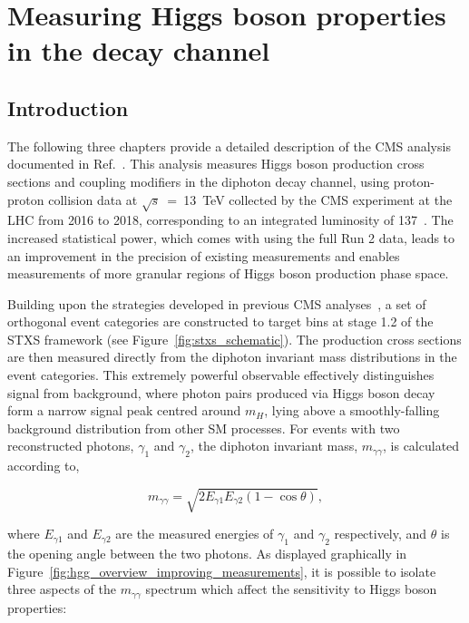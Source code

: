 \chapter{Measuring Higgs boson properties in the \Hgg decay channel}
\label{chap:hgg_overview}

\section{Introduction}\label{sec:hgg_introduction}
The following three chapters provide a detailed description of the CMS \Hgg analysis documented in Ref.~\cite{CMS-PAS-HIG-19-015}. This analysis measures Higgs boson production cross sections and coupling modifiers in the diphoton decay channel, using proton-proton collision data at $\sqrt{s}$~=~13~TeV collected by the CMS experiment at the LHC from 2016 to 2018, corresponding to an integrated luminosity of 137~\fbinv. The increased statistical power, which comes with using the full Run 2 data, leads to an improvement in the precision of existing measurements and enables measurements of more granular regions of Higgs boson production phase space. 

Building upon the strategies developed in previous CMS \Hgg analyses~\cite{Sirunyan:2018ouh,CMS-PAS-HIG-18-029,Sirunyan:2020sum}, a set of orthogonal event categories are constructed to target bins at stage 1.2 of the STXS framework (see Figure~\ref{fig:stxs_schematic}). The production cross sections are then measured directly from the diphoton invariant mass distributions in the event categories. This extremely powerful observable effectively distinguishes signal from background, where photon pairs produced via Higgs boson decay form a narrow signal peak centred around $m_H$, lying above a smoothly-falling background distribution from other SM processes. For events with two reconstructed photons, $\gamma_1$ and $\gamma_2$, the diphoton invariant mass, $m_{\gamma\gamma}$, is calculated according to,

\begin{equation}\label{eq:mgg}
    m_{\gamma\gamma} = \sqrt{2E_{\gamma1}E_{\gamma2}(1-\cos{\theta})},
\end{equation}

\noindent
where $E_{\gamma1}$ and $E_{\gamma2}$ are the measured energies of $\gamma_1$ and $\gamma_2$ respectively, and $\theta$ is the opening angle between the two photons. As displayed graphically in Figure~\ref{fig:hgg_overview_improving_measurements}, it is possible to isolate three aspects of the $m_{\gamma\gamma}$ spectrum which affect the sensitivity to Higgs boson properties: 

